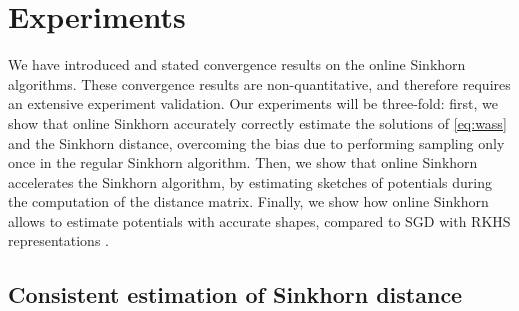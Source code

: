 \section{Experiments}

We have introduced and stated convergence results on the online Sinkhorn
algorithms. These convergence results are non-quantitative, and therefore
requires an extensive experiment validation. Our experiments will be three-fold:
first, we show that online Sinkhorn accurately correctly estimate the solutions
of \eqref{eq:wass} and the Sinkhorn distance, overcoming the bias due to
performing sampling only once in the regular Sinkhorn algorithm. Then, we show
that online Sinkhorn accelerates the Sinkhorn algorithm, by estimating sketches
of potentials during the computation of the distance matrix. Finally, we show
how online Sinkhorn allows to estimate potentials with accurate shapes, compared
to SGD with RKHS representations \citep{2016-genevay-nips}.

\subsection{Consistent estimation of Sinkhorn distance}

